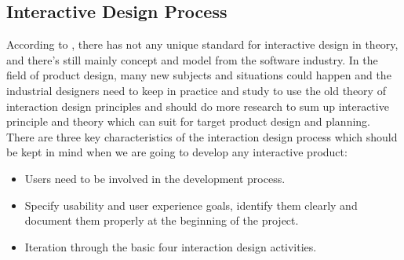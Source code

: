\subsection{Interactive Design Process}
According to \citet{Yang2009}, there has not any unique
standard for interactive design in theory, and there's still mainly concept and
model from the software industry. In the field of product design, many new
subjects and situations could happen and the industrial designers need to keep
in practice and study to use the old theory of interaction design principles and
should do more research to sum up  interactive principle and theory which can
suit for target product design and planning. There are three key characteristics
of the interaction design process \cite{preece2002interaction} which should be kept
in mind when we are going to develop any interactive product:
\begin{itemize}
\item Users need to be involved in the development  process.
\item  Specify usability and user experience goals, identify them clearly and
document them properly  at the beginning of the project.
\item  Iteration through the basic four interaction design activities.
\end{itemize}


